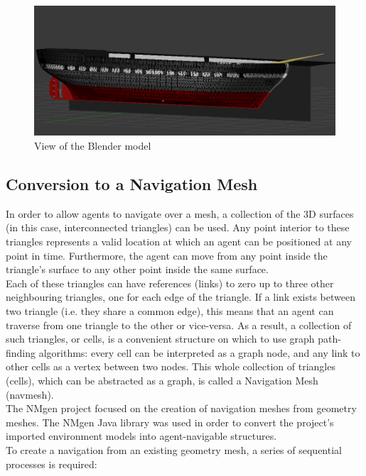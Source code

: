 \begin{figure}[H]
	\centering
	\includegraphics[width=1\textwidth]{../images/wireframe.png}
	\caption{View of the Blender model}
\end{figure}

\subsection{Conversion to a Navigation Mesh}
In order to allow agents to navigate over a mesh, a collection of the 3D surfaces (in this case, interconnected triangles) can be used. Any point interior to these triangles represents a valid location at which an agent can be positioned at any point in time. Furthermore, the agent can move from any point inside the triangle's surface to any other point inside the same surface.\\
Each of these triangles can have references (links) to zero up to three other neighbouring triangles, one for each edge of the triangle. If a link exists between two triangle (i.e. they share a common edge), this means that an agent can traverse from one triangle to the other or vice-versa. As a result, a collection of such triangles, or cells, is a convenient structure on which to use graph path-finding algorithms: every cell can be interpreted as a graph node, and any link to other cells as a vertex between two nodes. This whole collection of triangles (cells), which can be abstracted as a graph, is called a Navigation Mesh (navmesh).\\
The NMgen project focused on the creation of navigation meshes from geometry meshes. The NMgen Java library was used in order to convert the project's imported environment models into agent-navigable structures.\\
To create a navigation from an existing geometry mesh, a series of sequential processes is required:
